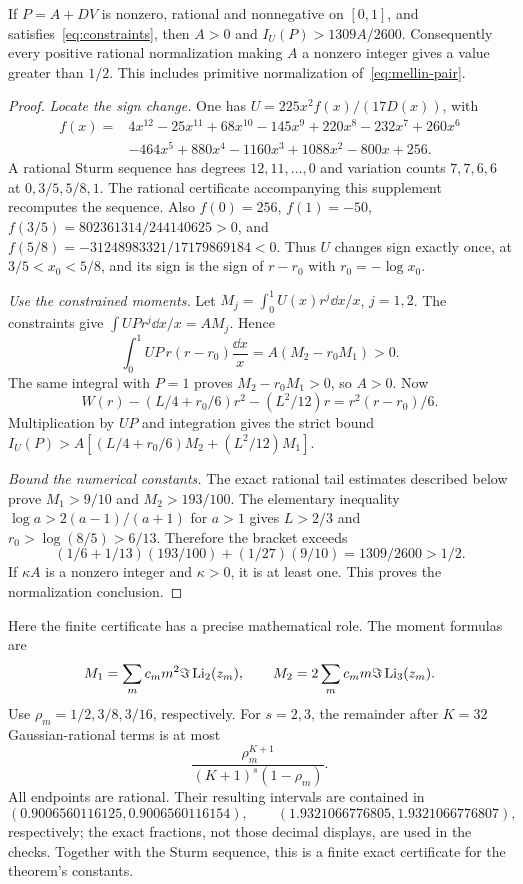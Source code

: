 \begin{theorem}\label{thm:mellin}
If $P=A+DV$ is nonzero, rational and nonnegative on $[0,1]$, and
satisfies~\eqref{eq:constraints}, then $A>0$ and
$I_U(P)>1309A/2600$. Consequently every positive rational
normalization making $A$ a nonzero integer gives a value greater
than $1/2$. This includes primitive normalization of~\eqref{eq:mellin-pair}.
\end{theorem}
\begin{proof}
\emph{Locate the sign change.}
One has $U=225x^2f(x)/(17D(x))$, with
\begin{align*}
 f(x)={}&4x^{12}-25x^{11}+68x^{10}-145x^9+220x^8-232x^7
       +260x^6\\
       &-464x^5+880x^4-1160x^3+1088x^2-800x+256.
\end{align*}
A rational Sturm sequence has degrees $12,11,\ldots,0$ and
variation counts $7,7,6,6$ at $0,3/5,5/8,1$. The rational certificate
accompanying this supplement recomputes the sequence. Also
$f(0)=256$, $f(1)=-50$,
$f(3/5)=802361314/244140625>0$, and
$f(5/8)=-31248983321/17179869184<0$.
Thus $U$ changes sign exactly once, at $3/5<x_0<5/8$, and its sign
is the sign of $r-r_0$ with $r_0=-\log x_0$.

\emph{Use the constrained moments.}
Let $M_j=\int_0^1U(x)r^j\dd x/x$, $j=1,2$.
The constraints give $\int UPr^j\dd x/x=AM_j$. Hence
\[
 \int_0^1 UP\,r(r-r_0)\frac{\dd x}{x}
       =A(M_2-r_0M_1)>0.
\]
The same integral with $P=1$ proves $M_2-r_0M_1>0$, so $A>0$.
Now
\[
 W(r)-(L/4+r_0/6)r^2-(L^2/12)r=r^2(r-r_0)/6.
\]
Multiplication by $UP$ and integration gives the strict bound
$I_U(P)>A[(L/4+r_0/6)M_2+(L^2/12)M_1]$.

\emph{Bound the numerical constants.}
The exact rational tail estimates described below prove
$M_1>9/10$ and $M_2>193/100$.
The elementary inequality $\log a>2(a-1)/(a+1)$ for $a>1$ gives
$L>2/3$ and $r_0>\log(8/5)>6/13$. Therefore the bracket exceeds
\[
 (1/6+1/13)(193/100)+(1/27)(9/10)=1309/2600>1/2.
\]
If $\kappa A$ is a nonzero integer and $\kappa>0$, it is at least one.
This proves the normalization conclusion.
\end{proof}

Here the finite certificate has a precise mathematical role. The moment
formulas are
\[
 M_1=\sum_m c_mm^2\Im\operatorname{Li}_2(z_m),\qquad
 M_2=2\sum_m c_mm\Im\operatorname{Li}_3(z_m).
\]
Use $\rho_m=1/2,3/8,3/16$, respectively. For $s=2,3$, the remainder
after $K=32$ Gaussian-rational terms is at most
\[
 \frac{\rho_m^{K+1}}{(K+1)^s(1-\rho_m)}.
\]
All endpoints are rational. Their resulting intervals are contained in
\[
 (0.9006560116125,0.9006560116154),\qquad
 (1.9321066776805,1.9321066776807),
\]
respectively; the exact fractions, not those
decimal displays, are used in the checks. Together with the Sturm
sequence, this is a finite exact certificate for the theorem's constants.

